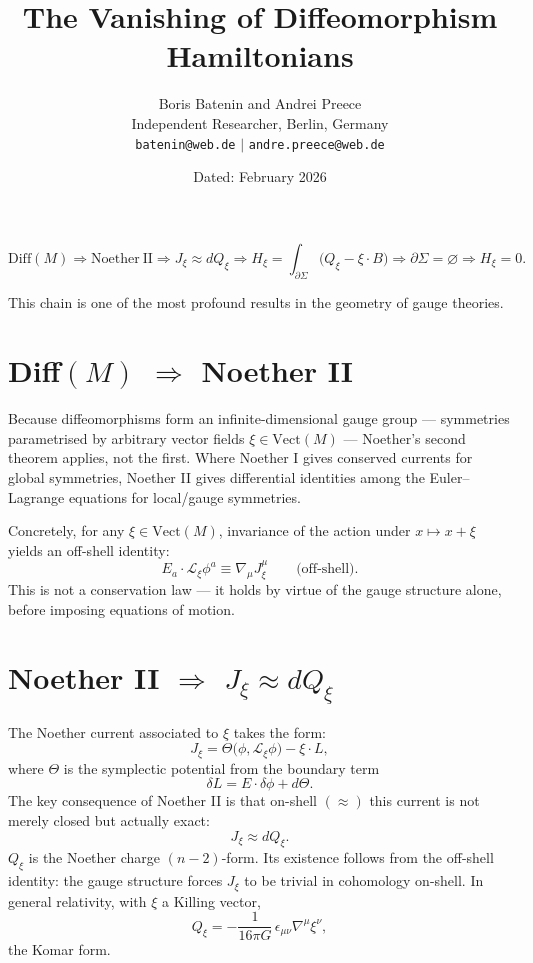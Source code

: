 \documentclass[12pt]{article}
\title{\textbf{The Vanishing of Diffeomorphism Hamiltonians}}
\author{
Boris Batenin and Andrei Preece\\
Independent Researcher, Berlin, Germany\\
\texttt{batenin@web.de} $\mid$ \texttt{andre.preece@web.de}
}
\date{Dated: February 2026}
\newcommand{\blueheading}[1]{\textcolor{sectionblue}{#1}}
\begin{document}
\maketitle

\begin{center}
\small
\begin{minipage}{0.96\linewidth}
\[
\mathrm{Diff}(M)
\Rightarrow
\mathrm{Noether\ II}
\Rightarrow
J_{\xi} \approx dQ_{\xi}
\Rightarrow
H_{\xi}=\int_{\partial\Sigma}\bigl(Q_{\xi}-\xi\cdot B\bigr)
\Rightarrow
\partial\Sigma=\varnothing
\Rightarrow
H_{\xi}=0.
\]
\end{minipage}
\end{center}

This chain is one of the most profound results in the geometry of gauge theories.

\section{\blueheading{Diff$(M)$ $\Rightarrow$ Noether II}}

Because diffeomorphisms form an infinite-dimensional gauge group --- symmetries parametrised by arbitrary vector fields $\xi\in\mathrm{Vect}(M)$ --- Noether's second theorem applies, not the first. Where Noether I gives conserved currents for global symmetries, Noether II gives differential identities among the Euler--Lagrange equations for local/gauge symmetries.

Concretely, for any $\xi\in\mathrm{Vect}(M)$, invariance of the action under $x\mapsto x+\xi$ yields an off-shell identity:
\[
E_a\cdot\mathcal{L}_{\xi}\phi^a \equiv \nabla_{\mu}J^{\mu}_{\xi}
\qquad\text{(off-shell)}.
\]
This is not a conservation law --- it holds by virtue of the gauge structure alone, before imposing equations of motion.

\section{\blueheading{Noether II $\Rightarrow$ $J_{\xi}\approx dQ_{\xi}$}}

The Noether current associated to $\xi$ takes the form:
\[
J_{\xi}=\Theta\bigl(\phi,\mathcal{L}_{\xi}\phi\bigr)-\xi\cdot L,
\]
where $\Theta$ is the symplectic potential from the boundary term
\[
\delta L = E\cdot\delta\phi+d\Theta.
\]
The key consequence of Noether II is that on-shell $(\approx)$ this current is not merely closed but actually exact:
\[
J_{\xi}\approx dQ_{\xi}.
\]
$Q_{\xi}$ is the Noether charge $(n-2)$-form. Its existence follows from the off-shell identity: the gauge structure forces $J_{\xi}$ to be trivial in cohomology on-shell. In general relativity, with $\xi$ a Killing vector,
\[
Q_{\xi}=-\frac{1}{16\pi G}\,\epsilon_{\mu\nu}\nabla^{\mu}\xi^{\nu},
\]
the Komar form.
\end{document}
